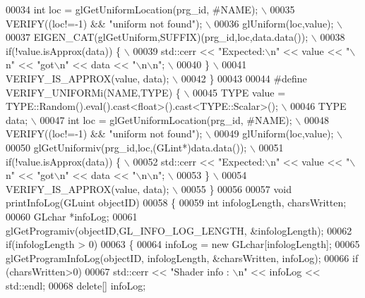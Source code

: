 \begin{DoxyCode}
00034 \textcolor{preprocessor}{    int loc = glGetUniformLocation(prg\_id, #NAME); \(\backslash\)}
00035 \textcolor{preprocessor}{    VERIFY((loc!=-1) && "uniform not found"); \(\backslash\)}
00036 \textcolor{preprocessor}{    glUniform(loc,value); \(\backslash\)}
00037 \textcolor{preprocessor}{    EIGEN\_CAT(glGetUniform,SUFFIX)(prg\_id,loc,data.data()); \(\backslash\)}
00038 \textcolor{preprocessor}{    if(!value.isApprox(data)) \{ \(\backslash\)}
00039 \textcolor{preprocessor}{      std::cerr << "Expected:\(\backslash\)n" << value << "\(\backslash\)n" << "got\(\backslash\)n" << data << "\(\backslash\)n\(\backslash\)n"; \(\backslash\)}
00040 \textcolor{preprocessor}{    \} \(\backslash\)}
00041 \textcolor{preprocessor}{    VERIFY\_IS\_APPROX(value, data); \(\backslash\)}
00042 \textcolor{preprocessor}{  \}}
00043   
00044 \textcolor{preprocessor}{#define VERIFY\_UNIFORMi(NAME,TYPE) \{ \(\backslash\)}
00045 \textcolor{preprocessor}{    TYPE value = TYPE::Random().eval().cast<float>().cast<TYPE::Scalar>(); \(\backslash\)}
00046 \textcolor{preprocessor}{    TYPE data; \(\backslash\)}
00047 \textcolor{preprocessor}{    int loc = glGetUniformLocation(prg\_id, #NAME); \(\backslash\)}
00048 \textcolor{preprocessor}{    VERIFY((loc!=-1) && "uniform not found"); \(\backslash\)}
00049 \textcolor{preprocessor}{    glUniform(loc,value); \(\backslash\)}
00050 \textcolor{preprocessor}{    glGetUniformiv(prg\_id,loc,(GLint*)data.data()); \(\backslash\)}
00051 \textcolor{preprocessor}{    if(!value.isApprox(data)) \{ \(\backslash\)}
00052 \textcolor{preprocessor}{      std::cerr << "Expected:\(\backslash\)n" << value << "\(\backslash\)n" << "got\(\backslash\)n" << data << "\(\backslash\)n\(\backslash\)n"; \(\backslash\)}
00053 \textcolor{preprocessor}{    \} \(\backslash\)}
00054 \textcolor{preprocessor}{    VERIFY\_IS\_APPROX(value, data); \(\backslash\)}
00055 \textcolor{preprocessor}{  \}}
00056   
00057 \textcolor{keywordtype}{void} printInfoLog(GLuint objectID)
00058 \{
00059     \textcolor{keywordtype}{int} infologLength, charsWritten;
00060     GLchar *infoLog;
00061     glGetProgramiv(objectID,GL\_INFO\_LOG\_LENGTH, &infologLength);
00062     \textcolor{keywordflow}{if}(infologLength > 0)
00063     \{
00064         infoLog = \textcolor{keyword}{new} GLchar[infologLength];
00065         glGetProgramInfoLog(objectID, infologLength, &charsWritten, infoLog);
00066         \textcolor{keywordflow}{if} (charsWritten>0)
00067           std::cerr << \textcolor{stringliteral}{"Shader info : \(\backslash\)n"} << infoLog << std::endl;
00068         \textcolor{keyword}{delete}[] infoLog;

\end{DoxyCode}
